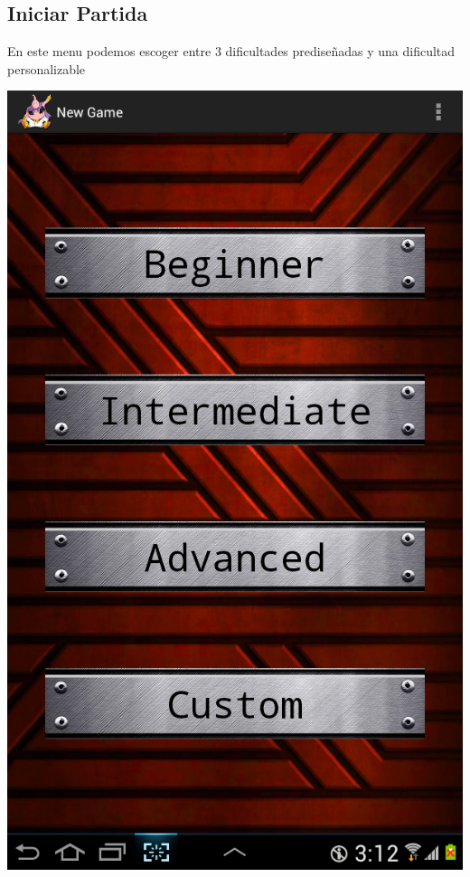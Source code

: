 \documentclass[11pt]{article} %
\begin{document}
\subsection{Iniciar Partida}
En este menu podemos escoger entre 3 dificultades prediseñadas y una dificultad personalizable
\begin{center}
\includegraphics[scale=0.2]{Imagenes/SSMenuNewGame.png}
\end{center}
\end{document}

